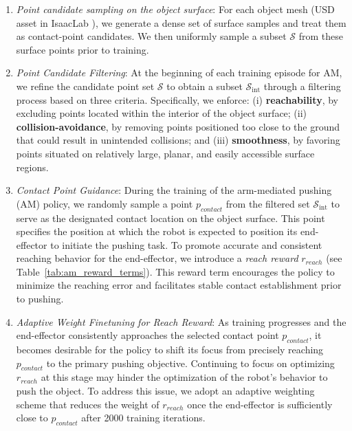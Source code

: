 \begin{enumerate}
    \item \textit{Point candidate sampling on the object surface}: For each object mesh (USD asset in IsaacLab \cite{Baginski2025IsaacLab}), we generate a dense set of surface samples and treat them as contact-point candidates. We then uniformly sample a subset $\mathcal{S}$ from these surface points prior to training.
    \item \textit{Point Candidate Filtering}: At the beginning of each training episode for AM, we refine the candidate point set $\mathcal{S}$ to obtain a subset $\mathcal{S}_{\text{int}}$ through a filtering process based on three criteria. Specifically, we enforce: (i) \textbf{reachability}, by excluding points located within the interior of the object surface; (ii) \textbf{collision-avoidance}, by removing points positioned too close to the ground that could result in unintended collisions; and (iii) \textbf{smoothness}, by favoring points situated on relatively large, planar, and easily accessible surface regions. 
    \item \textit{Contact Point Guidance}: During the training of the arm-mediated pushing (AM) policy, we randomly sample a point $p_{contact}$ from the filtered set $\mathcal{S}_{\text{int}}$ to serve as the designated contact location on the object surface. This point specifies the position at which the robot is expected to position its end-effector to initiate the pushing task. To promote accurate and consistent reaching behavior for the end-effector, we introduce a \emph{reach reward} $r_{reach}$ (see Table~\ref{tab:am_reward_terms}). This reward term encourages the policy to minimize the reaching error and facilitates stable contact establishment prior to pushing.
    \item \textit{Adaptive Weight Finetuning for Reach Reward}: As training progresses and the end-effector consistently approaches the selected contact point $p_{contact}$, it becomes desirable for the policy to shift its focus from precisely reaching $p_{contact}$ to the primary pushing objective. Continuing to focus on optimizing $r_{reach}$ at this stage may hinder the optimization of the robot's behavior to push the object. To address this issue, we adopt an adaptive weighting scheme that reduces the weight of $r_{reach}$ once the end-effector is sufficiently close to $p_{contact}$ after 2000 training iterations. 
\end{enumerate}




